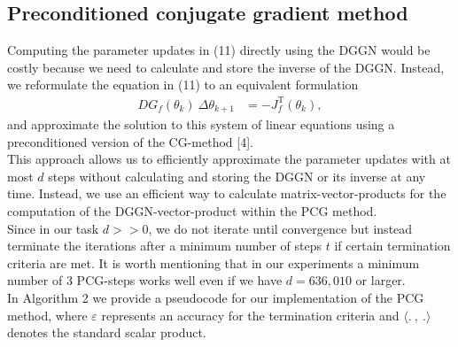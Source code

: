\documentclass[conference]{IEEEtran}
\begin{document}
\subsection{Preconditioned conjugate gradient method}
\noindent
Computing the parameter updates in (11) directly using the DGGN would be costly because we need to calculate and store the inverse of the DGGN. Instead, we reformulate the equation in (11) to an equivalent formulation
\begin{align}
	DG_{f}(\theta_{k})\: \Delta\theta_{k+1} &= -J_{f}^{\mathrm{T}}(\theta_{k}),
\end{align}
and approximate the solution to this system of linear equations using a preconditioned version of the CG-method [4]. \\
This approach allows us to efficiently approximate the parameter updates with at most $d$ steps without calculating and storing the DGGN or its inverse at any time. Instead, we use an efficient way to calculate matrix-vector-products for the computation of the DGGN-vector-product within the PCG method.\\
Since in our task $d>>0$, we do not iterate until convergence but instead terminate the iterations after a minimum number of steps $t$ if certain termination criteria are met. It is worth mentioning that in our experiments a minimum number of 3 PCG-steps works well even if we have $d=636,010$ or larger. \\
In Algorithm 2 we provide a pseudocode for our implementation of the PCG method, where $\varepsilon$ represents an accuracy for the termination criteria and $\langle .\:,\: .\rangle$ denotes the standard scalar product.
\end{document}
